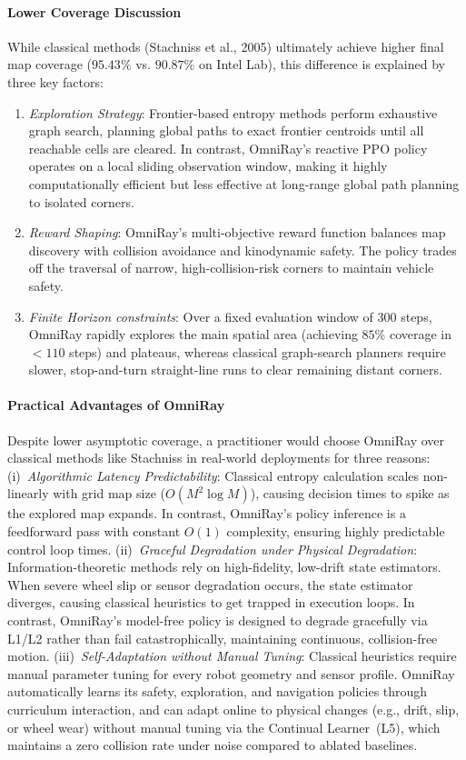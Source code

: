 \documentclass[11pt,a4paper]{article}
\begin{document}
\paragraph{Lower Coverage Discussion}
While classical methods (Stachniss et al., 2005) ultimately achieve higher final map coverage ($95.43\%$ vs. $90.87\%$ on Intel Lab), this difference is explained by three key factors:
\begin{enumerate}
    \item \textit{Exploration Strategy}: Frontier-based entropy methods perform exhaustive graph search, planning global paths to exact frontier centroids until all reachable cells are cleared. In contrast, OmniRay's reactive PPO policy operates on a local sliding observation window, making it highly computationally efficient but less effective at long-range global path planning to isolated corners.
    \item \textit{Reward Shaping}: OmniRay's multi-objective reward function balances map discovery with collision avoidance and kinodynamic safety. The policy trades off the traversal of narrow, high-collision-risk corners to maintain vehicle safety.
    \item \textit{Finite Horizon constraints}: Over a fixed evaluation window of 300 steps, OmniRay rapidly explores the main spatial area (achieving $85\%$ coverage in $<110$ steps) and plateaus, whereas classical graph-search planners require slower, stop-and-turn straight-line runs to clear remaining distant corners.
\end{enumerate}

\paragraph{Practical Advantages of OmniRay}
Despite lower asymptotic coverage, a practitioner would choose OmniRay over classical methods like Stachniss in real-world deployments for three reasons:
(i)~\textit{Algorithmic Latency Predictability}: Classical entropy calculation scales non-linearly with grid map size ($O(M^2 \log M)$), causing decision times to spike as the explored map expands. In contrast, OmniRay's policy inference is a feedforward pass with constant $O(1)$ complexity, ensuring highly predictable control loop times.
(ii)~\textit{Graceful Degradation under Physical Degradation}: Information-theoretic methods rely on high-fidelity, low-drift state estimators. When severe wheel slip or sensor degradation occurs, the state estimator diverges, causing classical heuristics to get trapped in execution loops. In contrast, OmniRay's model-free policy is designed to degrade gracefully via L1/L2 rather than fail catastrophically, maintaining continuous, collision-free motion.
(iii)~\textit{Self-Adaptation without Manual Tuning}: Classical heuristics require manual parameter tuning for every robot geometry and sensor profile. OmniRay automatically learns its safety, exploration, and navigation policies through curriculum interaction, and can adapt online to physical changes (e.g., drift, slip, or wheel wear) without manual tuning via the Continual Learner~(L5), which maintains a zero collision rate under noise compared to ablated baselines.
\end{document}
